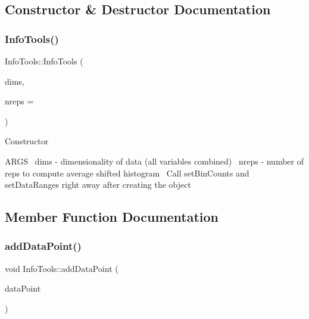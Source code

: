 \subsection{Constructor \& Destructor Documentation}
\mbox{\label{class_info_tools_a17566be3831cc61275587e09c775b49d}} 
\subsubsection{\texorpdfstring{Info\+Tools()}{InfoTools()}}
{\footnotesize\ttfamily Info\+Tools\+::\+Info\+Tools (\begin{DoxyParamCaption}\item[{int}]{dims,  }\item[{int}]{nreps = {} }\end{DoxyParamCaption})\hspace{0.3cm}{\ttfamily [inline]}}

Constructor

A\+R\+GS~\newline
 dims -\/ dimensionality of data (all variables combined)~\newline
 nreps -\/ number of reps to compute average shifted histogram~\newline
 Call set\+Bin\+Counts and set\+Data\+Ranges right away after creating the object

\subsection{Member Function Documentation}
\mbox{\label{class_info_tools_ae59fff52cbd2513ccd3d3f8bd5a4243d}} 
\subsubsection{\texorpdfstring{add\+Data\+Point()}{addDataPoint()}}
{\footnotesize\ttfamily void Info\+Tools\+::add\+Data\+Point (\begin{DoxyParamCaption}\item[{T\+Vector$<$ double $>$ \&}]{data\+Point }\end{DoxyParamCaption})\hspace{0.3cm}{\ttfamily [inline]}}




